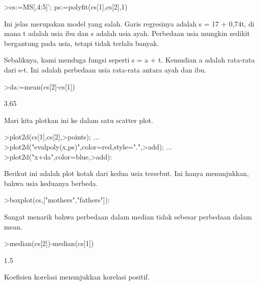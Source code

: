 \documentclass[12pt,arial,letterpaper]{book}
\begin{document}
\begin{eulernootebook}
\begin{eulercomment}
\begin{eulercomment}
\begin{eulernootebook}
\begin{eulercomment}
\begin{eulercomment}
\begin{eulercomment}
\begin{eulercomment}
\begin{eulercomment}
\begin{eulercomment}
\begin{eulercomment}
\begin{eulerprompt}
>cs:=MS[,4:5]'; ps:=polyfit(cs[1],cs[2],1)
\end{eulerprompt}
\begin{euleroutput}
  [17.3789,  0.740964]
\end{euleroutput}
\begin{eulercomment}
Ini jelas merupakan model yang salah. Garis regresinya adalah s = 17 +
0,74t, di mana t adalah usia ibu dan s adalah usia ayah. Perbedaan
usia mungkin sedikit bergantung pada usia, tetapi tidak terlalu
banyak.

Sebaliknya, kami menduga fungsi seperti s = a + t. Kemudian a adalah
rata-rata dari s-t. Ini adalah perbedaan usia rata-rata antara ayah
dan ibu.
\end{eulercomment}
\begin{eulerprompt}
>da:=mean(cs[2]-cs[1])
\end{eulerprompt}
\begin{euleroutput}
  3.65
\end{euleroutput}
\begin{eulercomment}
Mari kita plotkan ini ke dalam satu scatter plot.
\end{eulercomment}
\begin{eulerprompt}
>plot2d(cs[1],cs[2],>points);  ...
>plot2d("evalpoly(x,ps)",color=red,style=".",>add);  ...
>plot2d("x+da",color=blue,>add):
\end{eulerprompt}
\begin{eulercomment}
Berikut ini adalah plot kotak dari kedua usia tersebut. Ini hanya
menunjukkan, bahwa usia keduanya berbeda.
\end{eulercomment}
\begin{eulerprompt}
>boxplot(cs,["mothers","fathers"]):
\end{eulerprompt}
\begin{eulercomment}
Sangat menarik bahwa perbedaan dalam median tidak sebesar perbedaan
dalam mean.
\end{eulercomment}
\begin{eulerprompt}
>median(cs[2])-median(cs[1])
\end{eulerprompt}
\begin{euleroutput}
  1.5
\end{euleroutput}
\begin{eulercomment}
Koefisien korelasi menunjukkan korelasi positif.
\end{eulercomment}

\end{eulercomment}
\end{eulercomment}
\end{eulercomment}
\end{eulercomment}
\end{eulercomment}
\end{eulercomment}
\end{eulercomment}
\end{eulernootebook}
\end{eulercomment}
\end{eulercomment}
\end{eulernootebook}
\end{document}
